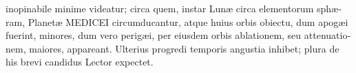 \documentclass[11pt,twoside,openany]{book}
\begin{document}
\begin{otherlanguage}{latin}
inopinabile minime videatur; circa quem, instar Lunæ circa elementorum sphæram, Planetæ MEDICEI circumducantur, atque huius orbis obiectu, dum apogæi fuerint, minores, dum vero perigæi, per eiusdem orbis ablationem, seu attenuationem, maiores, appareant. Ulterius progredi temporis angustia inhibet; plura de his brevi candidus Lector expectet.

\end{otherlanguage}
\end{document}
